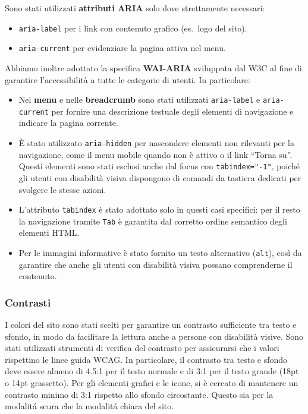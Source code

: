 Sono stati utilizzati \textbf{attributi ARIA} solo dove strettamente necessari:
\begin{itemize}
  \item \verb|aria-label| per i link con contenuto grafico (es.\ logo del sito).
  \item \verb|aria-current| per evidenziare la pagina attiva nel menu.
\end{itemize}
Abbiamo inoltre adottato la specifica \textbf{WAI-ARIA} sviluppata dal W3C al fine di garantire l’accessibilità a tutte le categorie di utenti. In particolare:
\begin{itemize}
  \item Nel \textbf{menu} e nelle \textbf{breadcrumb} sono stati utilizzati \verb|aria-label| e \verb|aria-current| per fornire una descrizione testuale degli elementi di navigazione e indicare la pagina corrente.
  \item È stato utilizzato \verb|aria-hidden| per nascondere elementi non rilevanti per la navigazione, come il menu mobile quando non è attivo o il link “Torna su”. Questi elementi sono stati esclusi anche dal focus con \verb|tabindex="-1"|, poiché gli utenti con disabilità visiva dispongono di comandi da tastiera dedicati per svolgere le stesse azioni.
  \item L’attributo \verb|tabindex| è stato adottato solo in questi casi specifici: per il resto la navigazione tramite \texttt{Tab} è garantita dal corretto ordine semantico degli elementi HTML.
  \item Per le immagini informative è stato fornito un testo alternativo (\verb|alt|), così da garantire che anche gli utenti con disabilità visiva possano comprenderne il contenuto.
\end{itemize}

\subsubsection{Contrasti}

I colori del sito sono stati scelti per garantire un contrasto sufficiente tra testo e sfondo, in modo da facilitare la lettura anche a persone con disabilità visive. Sono stati utilizzati strumenti di verifica del contrasto per assicurarsi che i valori rispettino le linee guida WCAG. In particolare, il contrasto tra testo e sfondo deve essere almeno di 4.5:1 per il testo normale e di 3:1 per il testo grande (18pt o 14pt grassetto). Per gli elementi grafici e le icone, si è cercato di mantenere un contrasto minimo di 3:1 rispetto allo sfondo circostante. Questo sia per la modalitá scura che la modalitá chiara del sito.

